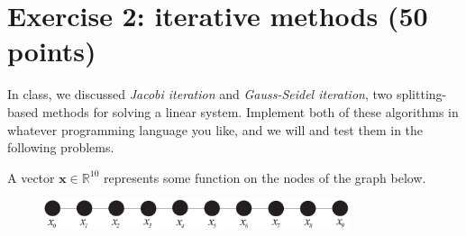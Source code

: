 \begin{correction}

\end{correction}


\section*{Exercise 2: iterative methods \normalsize \textnormal(50 points)}

In class, we discussed {\em Jacobi iteration} and {\em Gauss-Seidel iteration}, two splitting-based methods for solving a linear system. Implement both of these algorithms in whatever programming language you like, and we will and test them in the following problems.

A vector $\mathbf x \in \mathds{R}^{10}$ represents some function on the nodes of the graph below. 
\begin{figure}[h!]
\centering
\includegraphics[width=0.8\textwidth]{graph.pdf}
\end{figure}

